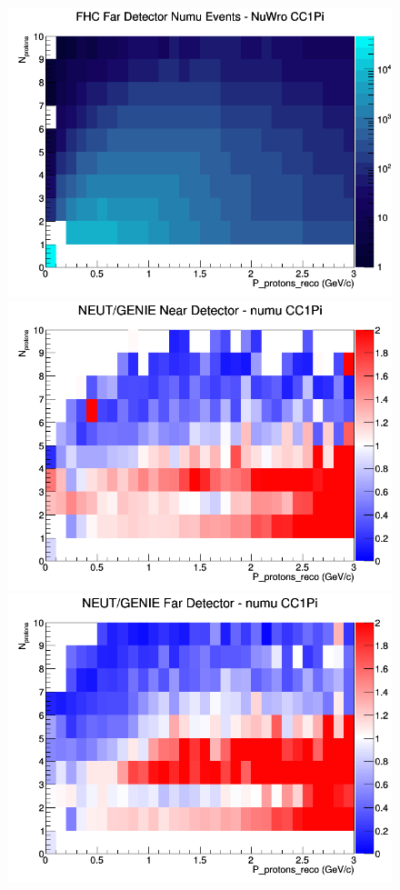 \documentclass[12pt]{article}
\begin{document}
\begin{figure}[h]
\endminipage
{}
\includegraphics[width=\linewidth]{eff_N_P/FGT/protons/CC1Pi_FHC_FD_numu_N_P_NuWro.png}
\endminipage
\newline
{}
\includegraphics[width=\linewidth]{eff_N_P/FGT/protons/ratios/CC1Pi_NEUT_GENIE_numu_near_N_P.png}
\endminipage
{}
\includegraphics[width=\linewidth]{eff_N_P/FGT/protons/ratios/CC1Pi_NEUT_GENIE_numu_far_N_P.png}

\end{figure}
\end{document}
